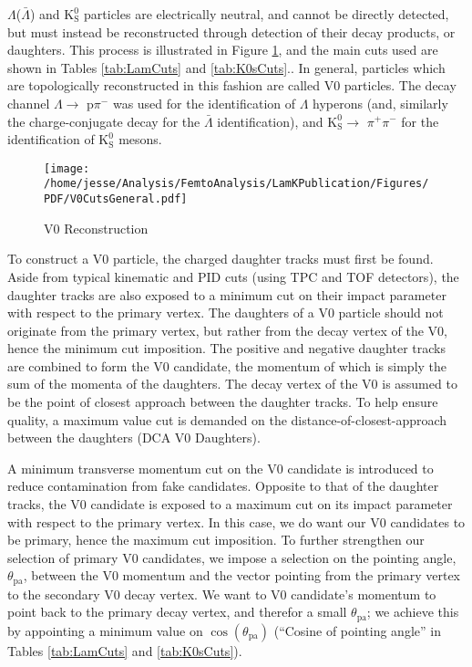 \documentclass[ALICE,manyauthors]{cernphprep}
\newcommand{\Lam}{$\Lambda$\xspace}
\newcommand{\ALam}{$\bar{\Lambda}$\xspace}
\newcommand{\LamALam}{$\Lambda$($\bar{\Lambda}$)\xspace}
\newcommand{\Ks}{$\mathrm{K^{0}_{S}}$\xspace}
\begin{document}
\LamALam and \Ks particles are electrically neutral, and cannot be directly detected, but must instead be reconstructed through detection of their decay products, or daughters.  
This process is illustrated in Figure \ref{fig:V0Reconstruction}, and the main cuts used are shown in Tables \ref{tab:LamCuts} and \ref{tab:K0sCuts}..
In general, particles which are topologically reconstructed in this fashion are called V0 particles.
The decay channel \Lam $\rightarrow$ p$\pi^{-}$ was used for the identification of \Lam hyperons (and, similarly the charge-conjugate decay for the \ALam identification), and \Ks $\rightarrow$ $\pi^{+}\pi^{-}$ for the identification of \Ks mesons.

\begin{figure}[h]
  \centering
  \texttt{[image: /home/jesse/Analysis/FemtoAnalysis/LamKPublication/Figures/PDF/V0CutsGeneral.pdf]}
  \caption[V0 Reconstruction]{V0 Reconstruction}
  \label{fig:V0Reconstruction}
\end{figure}

To construct a V0 particle, the charged daughter tracks must first be found.  
Aside from typical kinematic and PID cuts (using TPC and TOF detectors), the daughter tracks are also exposed to a minimum cut on their impact parameter with respect to the primary vertex.  
The daughters of a V0 particle should not originate from the primary vertex, but rather from the decay vertex of the V0, hence the minimum cut imposition.  The positive and negative daughter tracks are combined to form the V0 candidate, the momentum of which is simply the sum of the momenta of the daughters.
The decay vertex of the V0 is assumed to be the point of closest approach between the daughter tracks.
To help ensure quality, a maximum value cut is demanded on the distance-of-closest-approach between the daughters (DCA V0 Daughters).

A minimum transverse momentum cut on the V0 candidate is introduced to reduce contamination from fake candidates.
Opposite to that of the daughter tracks, the V0 candidate is exposed to a maximum cut on its impact parameter with respect to the primary vertex.
In this case, we do want our V0 candidates to be primary, hence the maximum cut imposition.
To further strengthen our selection of primary V0 candidates, we impose a selection on the pointing angle, $\theta_{\mathrm{pa}}$, between the V0 momentum and the vector pointing from the primary vertex to the secondary V0 decay vertex.
We want to V0 candidate's momentum to point back to the primary decay vertex, and therefor a small $\theta_{\mathrm{pa}}$; we achieve this by appointing a minimum value on $\cos(\theta_{\mathrm{pa}})$ (``Cosine of pointing angle'' in Tables \ref{tab:LamCuts} and \ref{tab:K0sCuts}).
\end{document}
